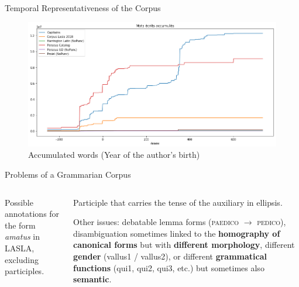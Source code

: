\documentclass[aspectratio=169]{beamer}
\begin{document}
\begin{frame}{Temporal Representativeness of the Corpus}

\begin{figure}
    \centering
    \includegraphics[width=.8\linewidth]{nlp-for-ch/images/lemmatisation_tokens_per_year.png}
    \caption{Accumulated words (Year of the author's birth)}
\end{figure}

\end{frame}

\begin{frame}{Problems of a Grammarian Corpus}
    \begin{columns}
        \begin{column}{.4\linewidth}
            \resizebox{\linewidth}{!}{%
                \begin{tabular}{lll}
                    \toprule
                    Form & Mood & Tense \\ \midrule
                    amatus (sum) & Indicative & Perfect \\
                    amatus (eram) & Indicative & Pluperfect \\
                    amatus (ero) & Indicative & Future perfect \\
                    amatus (sim) & Subjunctive & Perfect \\
                    amatus (essem) & Subjunctive & Pluperfect \\
                    amatus (esse) & Infinitive & Perfect \\
                    amatum (iri) & Infinitive & Future \\ \bottomrule
                \end{tabular}
            }
            {\tiny Possible annotations for the form \textit{amatus} in LASLA, excluding participles.}
        \end{column}
        \begin{column}{.6\linewidth}
            Participle that carries the tense of the auxiliary in ellipsis.
            
            Other issues: debatable lemma forms (\textsc{paedico} $\rightarrow$ \textsc{pedico}), disambiguation sometimes linked to the \textbf{homography of canonical forms} but with \textbf{different morphology}, different \textbf{gender} (vallus1 / vallus2), or different \textbf{grammatical functions} (qui1, qui2, qui3, etc.) but sometimes also \textbf{semantic}.
        \end{column}
    \end{columns}
\end{frame}
\end{document}
